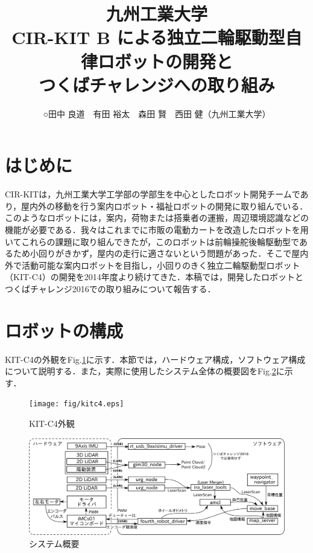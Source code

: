 \documentclass[10pt,a4paper]{jarticle}
\begin{document}
\title{九州工業大学\\CIR-KIT B による独立二輪駆動型自律ロボットの開発と\\つくばチャレンジへの取り組み}
\author{○田中 良道　有田 裕太　森田 賢　西田 健（九州工業大学）}
\pagestyle{empty}
\maketitle\thispagestyle{empty}

\section{はじめに}
CIR-KITは，九州工業大学工学部の学部生を中心としたロボット開発チームであり，屋内外の移動を行う案内ロボット・福祉ロボットの開発に取り組んでいる．このようなロボットには，案内，荷物または搭乗者の運搬，周辺環境認識などの機能が必要である．我々はこれまでに市販の電動カートを改造したロボットを用いてこれらの課題に取り組んできたが，このロボットは前輪操舵後輪駆動型であるため小回りがきかず，屋内の走行に適さないという問題があった．そこで屋内外で活動可能な案内ロボットを目指し，小回りのきく独立二輪駆動型ロボット（KIT-C4）の開発を2014年度より続けてきた．本稿では，開発したロボットとつくばチャレンジ2016での取り組みについて報告する．

\section{ロボットの構成}
KIT-C4の外観をFig.\ref{fig:kitc4}に示す．本節では，ハードウェア構成，ソフトウェア構成について説明する．また，実際に使用したシステム全体の概要図をFig.\ref{fig:system}に示す．
\begin{figure}[tbp]
\centering
 \texttt{[image: fig/kitc4.eps]}
 \caption{KIT-C4外観}
 \label{fig:kitc4}
\end{figure}

\begin{figure}[tbp]
\centering
 \includegraphics[width=17cm]{fig/whole_system.eps}
 \caption{システム概要}
 \label{fig:system}
\end{figure}
\end{document}
